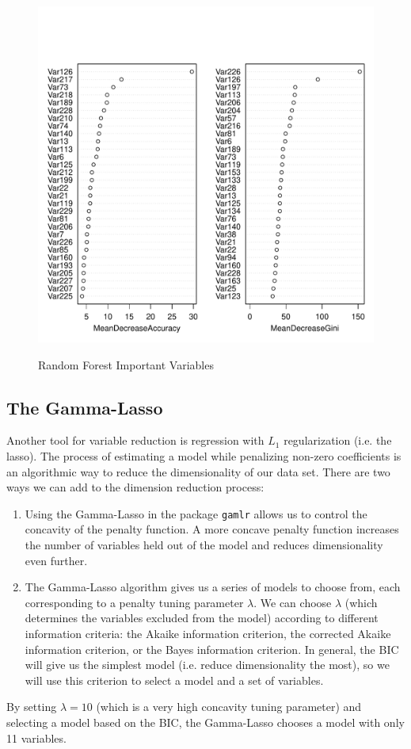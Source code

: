 \documentclass[11pt, fleqn]{article}
\begin{document}
\begin{figure}[!htb]
  \centering
  \caption{Random Forest Important Variables}
  \includegraphics[scale=.5]{rf_var_sel.pdf}
  \label{fig:rf_var_sel}
\end{figure}


\subsection{The Gamma-Lasso}

Another tool for variable reduction is regression with $L_1$ regularization (i.e. the lasso). The process of estimating a model while penalizing non-zero coefficients is an algorithmic way to reduce the dimensionality of our data set. There are two ways we can add to the dimension reduction process:
\begin{enumerate}
\item Using the Gamma-Lasso in the package \texttt{gamlr} allows us to control the concavity of the penalty function. A more concave penalty function increases the number of variables held out of the model and reduces dimensionality even further.
\item The Gamma-Lasso algorithm gives us a series of models to choose from, each corresponding to a penalty tuning parameter $\lambda$. We can choose $\lambda$ (which determines the variables excluded from the model) according to different information criteria: the Akaike information criterion, the corrected Akaike information criterion, or the Bayes information criterion. In general, the BIC will give us the simplest model (i.e. reduce dimensionality the most), so we will use this criterion to select a model and a set of variables.
\end{enumerate}
By setting $\lambda=10$ (which is a very high concavity tuning parameter) and selecting a model based on the BIC, the Gamma-Lasso chooses a model with only 11 variables.
\end{document}
